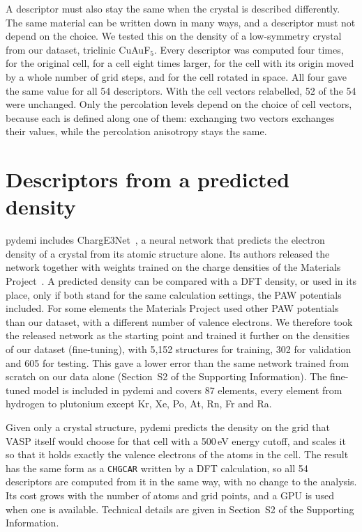 \documentclass[journal=jctcce,manuscript=article,email=true]{achemso}
\newcommand{\rev}[1]{{\color{blue}#1}}
\begin{document}
A descriptor must also stay the same when the crystal is described
differently. The same material can be written down in many ways, and a
descriptor must not depend on the choice. We tested this on the density of a
low-symmetry crystal from our dataset, triclinic CuAuF$_5$. Every descriptor
was computed four times, for the original cell, for a cell eight times larger,
for the cell with its origin moved by a whole number of grid steps, and for the
cell rotated in space. All four gave the same value for all \rev{54} descriptors.
\rev{With the cell vectors relabelled, 52 of the 54 were unchanged. Only the
percolation levels depend on the choice of cell vectors, because each is defined
along one of them: exchanging two vectors exchanges their values, while the
percolation anisotropy stays the same.}

\section{Descriptors from a predicted density}
\label{sec:ml}

pydemi includes ChargE3Net~\cite{koker2024}, a neural network that predicts the
electron density of a crystal from its atomic structure alone. Its authors
released the network together with weights trained on the charge densities of
the Materials Project~\cite{shen2022}. \rev{A predicted density can be compared
with a DFT density, or used in its place, only if both stand for the same
calculation settings, the PAW potentials included. For some elements the
Materials Project used other PAW potentials than our dataset, with a different
number of valence electrons. We therefore} took the released network as the starting point and trained it
further on the densities of our dataset (fine-tuning), with 5,152 structures for
training, 302 for validation and 605 for testing. This gave a lower error than
the same network trained from scratch on our data alone (Section~S2 of the
Supporting Information). The fine-tuned model is included in pydemi and covers
87 elements, every element from hydrogen to plutonium except Kr, Xe, Po, At, Rn,
Fr and Ra.

Given only a crystal structure, pydemi predicts the density on the grid that
VASP itself would choose for that cell with a 500\,eV energy cutoff, and scales
it so that it holds exactly the valence electrons of the atoms in the cell. The
result has the same form as a \texttt{CHGCAR} written by a DFT calculation, so
all \rev{54} descriptors are computed from it in the same way, with no change to the
analysis. Its cost grows with the number of atoms and grid points, and a GPU is
used when one is available. Technical details are given in Section~S2 of the Supporting Information.
\end{document}
